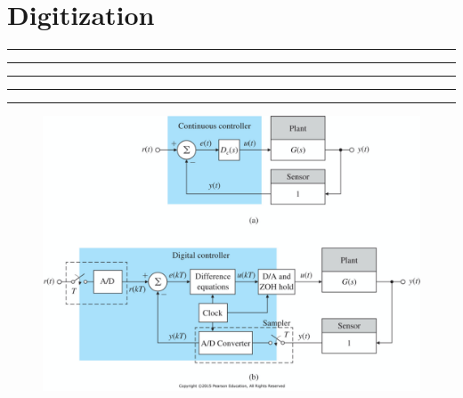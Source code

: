 \setcounter{chapter}{7}
\setcounter{section}{0}
\section{Digitization}
\vspace{-8pt} \hrule \hrule \hrule \hrule \hrule  \vspace{12pt}
\begin{figure}[!hb]
    \centering
    \includegraphics[width=20cm]{./FIG_Franklin/fig8-1.png}
\end{figure}